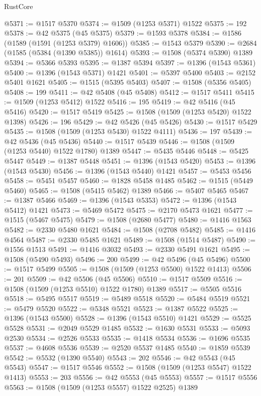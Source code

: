 \begin{lexlean}{RustCore}
\begin{coremodule}
@5371 := @1517 @5370
@5374 := @1509 (@1253 @5371) @1522
@5375 := 192
@5378 := @42 @5375 (@45 @5375)
@5379 := @1593 @5378
@5384 := @1586 (@1589 (@1591 (@1253 @5379) @1606))
@5385 := @1543 @5379
@5390 := @2684 (@1585 (@5384 (@1390 @5385)) @1614)
@5393 := @1508 (@5374 @5390) @1389
@5394 := @5366 @5393
@5395 := @1387 @5394
@5397 := @1396 (@1543 @5361)
@5400 := @1396 (@1543 @5371) @1421
@5401 := @5397 @5400
@5403 := @2152 @5401 @1621
@5405 := @1515 (@5395 @5403)
@5407 := @1508 (@5356 @5405)
@5408 := 199
@5411 := @42 @5408 (@45 @5408)
@5412 := @1517 @5411
@5415 := @1509 (@1253 @5412) @1522
@5416 := 195
@5419 := @42 @5416 (@45 @5416)
@5420 := @1517 @5419
@5425 := @1508 (@1509 (@1253 @5420) @1522 @1398)
@5426 := 196
@5429 := @42 @5426 (@45 @5426)
@5430 := @1517 @5429
@5435 := @1508 (@1509 (@1253 @5430) @1522 @4111)
@5436 := 197
@5439 := @42 @5436 (@45 @5436)
@5440 := @1517 @5439
@5446 := @1508 (@1509 (@1253 @5440) @1522 @1780) @1389
@5447 := @5435 @5446
@5448 := @5425 @5447
@5449 := @1387 @5448
@5451 := @1396 (@1543 @5420)
@5453 := @1396 (@1543 @5430)
@5456 := @1396 (@1543 @5440) @1421
@5457 := @5453 @5456
@5458 := @5451 @5457
@5460 := @1828 @5458 @1485
@5462 := @1515 (@5449 @5460)
@5465 := @1508 (@5415 @5462) @1389
@5466 := @5407 @5465
@5467 := @1387 @5466
@5469 := @1396 (@1543 @5353)
@5472 := @1396 (@1543 @5412) @1421
@5473 := @5469 @5472
@5475 := @2170 @5473 @1621
@5477 := @1515 (@5467 @5475)
@5479 := @1508 (@2680 @5477)
@5480 := @1416 @1563
@5482 := @2330 @5480 @1621
@5484 := @1508 (@2708 @5482)
@5485 := @1416 @4564
@5487 := @2330 @5485 @1621
@5489 := @1508 (@1514 @5487)
@5490 := @1556 @1513
@5491 := @1416 @3032
@5493 := @2330 @5491 @1621
@5495 := @1508 (@5490 @5493)
@5496 := 200
@5499 := @42 @5496 (@45 @5496)
@5500 := @1517 @5499
@5505 := @1508 (@1509 (@1253 @5500) @1522 @1413)
@5506 := 201
@5509 := @42 @5506 (@45 @5506)
@5510 := @1517 @5509
@5516 := @1508 (@1509 (@1253 @5510) @1522 @1780) @1389
@5517 := @5505 @5516
@5518 := @5495 @5517
@5519 := @5489 @5518
@5520 := @5484 @5519
@5521 := @5479 @5520
@5522 := @5348 @5521
@5523 := @1387 @5522
@5525 := @1396 (@1543 @5500)
@5528 := @1396 (@1543 @5510) @1421
@5529 := @5525 @5528
@5531 := @2049 @5529 @1485
@5532 := @1630 @5531
@5533 := @5093 @2530
@5534 := @2526 @5533
@5535 := @1418 @5534
@5536 := @1696 @5535
@5537 := @4608 @5536
@5539 := @2520 @5537 @1485
@5540 := @1859 @5539
@5542 := @5532 (@1390 @5540)
@5543 := 202
@5546 := @42 @5543 (@45 @5543)
@5547 := @1517 @5546
@5552 := @1508 (@1509 (@1253 @5547) @1522 @1413)
@5553 := 203
@5556 := @42 @5553 (@45 @5553)
@5557 := @1517 @5556
@5563 := @1508 (@1509 (@1253 @5557) @1522 @2525) @1389

\end{coremodule}
\end{lexlean}
